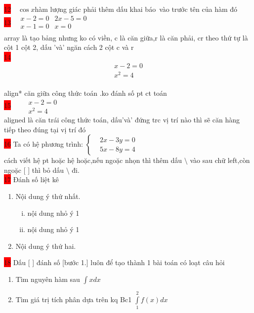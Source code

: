 \documentclass{article}
\begin{document}
\colorbox{red}{12}$\quad\cos x$\quad hàm lượng giác phải thêm dấu khai báo\ vào trước tên của hàm đó\\

 \colorbox{red}{13}$\quad\begin{array}{cr}
 x-2=0 & 2x-5=0\\
 x-1=0 & x=0\\
 \end{array}$\\
 array là tạo bảng nhưng ko có viền, c là căn giữa,r là căn phải, cr theo thứ tự là cột 1 cột 2, dấu 'và' ngăn cách 2 cột c và r\\
 \colorbox{red}{14}\begin{align*}
 x-2=0\\
 x^2=4
 \end{align*}\\
 align* căn giữa công thức toán .ko đánh số pt ct toán\\
\colorbox{red}{15} $\quad\begin{aligned}
 &x-2=0\\
 &x^2=4
 \end{aligned}$\\
 aligned là căn trái công thức toán, dấu'và' đứng trc vị trí nào thì sẽ căn hàng tiếp theo đúng tại vị trí đó\\
 
 \colorbox{red}{16} Ta có hệ phương trình: $\left\{\begin{aligned}
     & 2x-3y=0\\
     & 5x-8y=4
 \end{aligned}\right.$\\
 cách viết hệ pt hoặc hệ hoặc,nếu ngoặc nhọn thì thêm dấu $\setminus$ vào sau chữ left,còn ngoặc [ ] thì bỏ dấu $\setminus$ đi.\\
\colorbox{red}{17} Đánh số liệt kê
 \begin{enumerate}
 \item Nội dung ý thứ nhất.
 \begin{enumerate}[i.]
 \item nội dung nhỏ ý 1
 \item nội dung nhỏ ý 1
 \end{enumerate}
 \item Nội dung ý thứ hai.
 \end{enumerate}
\colorbox{red}{18}  Dấu [ ] đánh số [bước 1.] luôn để tạo thành 1 bài toán có loạt câu hỏi
\begin{enumerate}[Bước 1.]
\item Tìm nguyên hàm sau $\displaystyle\int xdx $
\item Tìm giá trị tích phân dựa trên kq Bc1 $\displaystyle\int\limits_1^2f(x)dx$
\end{enumerate}\\





 
\end{document}
